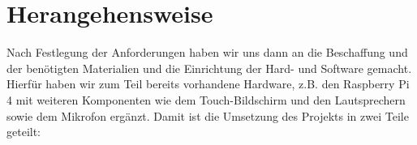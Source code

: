 \section{Herangehensweise}\label{herangehensweise}
Nach Festlegung der Anforderungen haben wir uns dann an die Beschaffung und der benötigten Materialien und die Einrichtung der Hard- und Software gemacht. Hierfür haben wir zum Teil bereits vorhandene Hardware, z.B. den Raspberry Pi 4 mit weiteren Komponenten wie dem Touch-Bildschirm und den Lautsprechern sowie dem Mikrofon ergänzt. Damit ist die Umsetzung des Projekts in zwei Teile geteilt:


\newpage